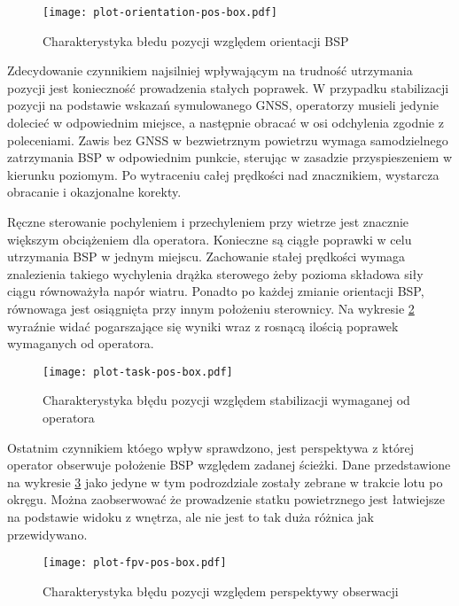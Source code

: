 \begin{figure}[!h]
    \centering \texttt{[image: plot-orientation-pos-box.pdf]}
    \caption{Charakterystyka błedu pozycji względem orientacji BSP}
    \label{fig:plot-orientation-pos-box}
\end{figure}

Zdecydowanie czynnikiem najsilniej wpływającym na trudność utrzymania pozycji jest konieczność prowadzenia stałych poprawek. W przypadku stabilizacji pozycji na podstawie wskazań symulowanego GNSS, operatorzy musieli jedynie dolecieć w odpowiednim miejsce, a następnie obracać w osi odchylenia zgodnie z poleceniami. Zawis bez GNSS w bezwietrznym powietrzu wymaga samodzielnego zatrzymania BSP w odpowiednim punkcie, sterując w zasadzie przyspieszeniem w kierunku poziomym. Po wytraceniu całej prędkości nad znacznikiem, wystarcza obracanie i okazjonalne korekty.

Ręczne sterowanie pochyleniem i przechyleniem przy wietrze jest znacznie większym obciążeniem dla operatora. Konieczne są ciągłe poprawki w celu utrzymania BSP w jednym miejscu. Zachowanie stałej prędkości wymaga znalezienia takiego wychylenia drążka sterowego żeby pozioma składowa siły ciągu równoważyła napór wiatru. Ponadto po każdej zmianie orientacji BSP, równowaga jest osiągnięta przy innym położeniu sterownicy. Na wykresie \ref{fig:plot-task-pos-box} wyraźnie widać pogarszające się wyniki wraz z rosnącą ilością poprawek wymaganych od operatora.

\begin{figure}[!h]
    \centering \texttt{[image: plot-task-pos-box.pdf]}
    \caption{Charakterystyka błędu pozycji względem stabilizacji wymaganej od operatora}
    \label{fig:plot-task-pos-box}
\end{figure}

Ostatnim czynnikiem któego wpływ sprawdzono, jest perspektywa z której operator obserwuje położenie BSP względem zadanej ścieżki. Dane przedstawione na wykresie \ref{fig:plot-fpv-pos-box} jako jedyne w tym podrozdziale zostały zebrane w trakcie lotu po okręgu. Można zaobserwować że prowadzenie statku powietrznego jest łatwiejsze na podstawie widoku z wnętrza, ale nie jest to tak duża różnica jak przewidywano.

\begin{figure}[!h]
    \centering \texttt{[image: plot-fpv-pos-box.pdf]}
    \caption{Charakterystyka błędu pozycji względem perspektywy obserwacji}
    \label{fig:plot-fpv-pos-box}
\end{figure}
